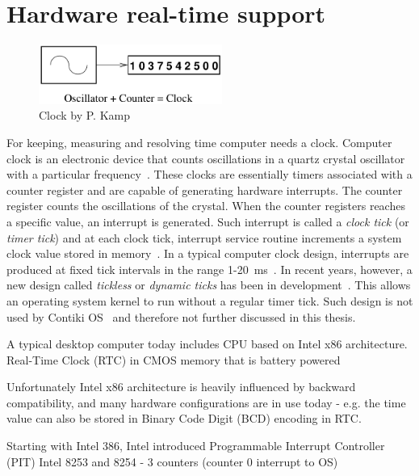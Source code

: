 
\chapter{Hardware real-time support}
\begin{figure}
	\centering
	\includegraphics[width=6cm,keepaspectratio]{fig/clock.png}
	\caption{Clock by P. Kamp}
	\label{fig:hw-clock}
\end{figure}
For keeping, measuring and resolving time computer needs a clock.
Computer clock is an electronic device that counts oscillations in a
quartz crystal oscillator with a particular frequency~\cite{thesis-sync}.
These clocks are essentially timers associated with a counter register and
are capable of generating hardware interrupts.
The counter register counts the oscillations of the crystal.
When the counter registers reaches a specific value,
an interrupt is generated.
Such interrupt is called a {\it{clock tick}} (or {\it{timer tick}}) and at each clock tick,
interrupt service routine increments a system clock value stored in memory~\cite{thesis-sync}.
In a typical computer clock design, interrupts are produced at
fixed tick intervals in the range 1-20~ms~\cite{nanokernel}.
In recent years, however, a new design called {\it{tickless}} or {\it{dynamic ticks}}
has been in development~\cite{kernel-timer-systems}.
This allows an operating system kernel to run without a regular timer tick.
Such design is not used by Contiki OS~\cite{contiki-docs} and
therefore not further discussed in this thesis.


A typical desktop computer today includes CPU based on Intel x86 architecture.
Real-Time Clock (RTC) in CMOS memory that is battery powered

Unfortunately Intel x86 architecture is heavily influenced by backward compatibility,
and many hardware configurations are in use today -
e.g. the time value can also be stored in Binary Code Digit (BCD) encoding in RTC.

Starting with Intel 386, Intel introduced
Programmable Interrupt Controller (PIT) Intel 8253 and 8254 - 3 counters (counter 0 interrupt to OS)

